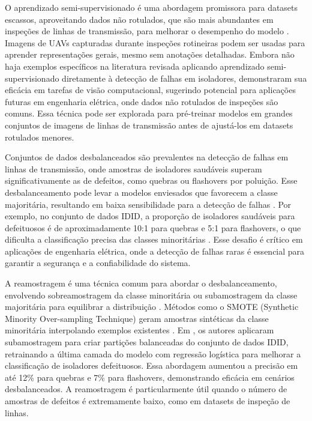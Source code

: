 O aprendizado semi-supervisionado é uma abordagem promissora para datasets escassos, aproveitando dados não rotulados, que são mais abundantes em inspeções de linhas de transmissão, para melhorar o desempenho do modelo \cite{van2020survey}. Imagens de UAVs capturadas durante inspeções rotineiras podem ser usadas para aprender representações gerais, mesmo sem anotações detalhadas. Embora não haja exemplos específicos na literatura revisada aplicando aprendizado semi-supervisionado diretamente à detecção de falhas em isoladores,  demonstraram sua eficácia em tarefas de visão computacional, sugerindo potencial para aplicações futuras em engenharia elétrica, onde dados não rotulados de inspeções são comuns. Essa técnica pode ser explorada para pré-treinar modelos em grandes conjuntos de imagens de linhas de transmissão antes de ajustá-los em datasets rotulados menores.

Conjuntos de dados desbalanceados são prevalentes na detecção de falhas em linhas de transmissão, onde amostras de isoladores saudáveis superam significativamente as de defeitos, como quebras ou flashovers por poluição. Esse desbalanceamento pode levar a modelos enviesados que favorecem a classe majoritária, resultando em baixa sensibilidade para a detecção de falhas \cite{he2009learning}. Por exemplo, no conjunto de dados IDID, a proporção de isoladores saudáveis para defeituosos é de aproximadamente 10:1 para quebras e 5:1 para flashovers, o que dificulta a classificação precisa das classes minoritárias \cite{oberweger2024xai}. Esse desafio é crítico em aplicações de engenharia elétrica, onde a detecção de falhas raras é essencial para garantir a segurança e a confiabilidade do sistema.

A reamostragem é uma técnica comum para abordar o desbalanceamento, envolvendo sobreamostragem da classe minoritária ou subamostragem da classe majoritária para equilibrar a distribuição \cite{johnson2019survey}. Métodos como o SMOTE (Synthetic Minority Over-sampling Technique) geram amostras sintéticas da classe minoritária interpolando exemplos existentes \cite{chawla2002smote}. Em , os autores aplicaram subamostragem para criar partições balanceadas do conjunto de dados IDID, retrainando a última camada do modelo com regressão logística para melhorar a classificação de isoladores defeituosos. Essa abordagem aumentou a precisão em até 12\% para quebras e 7\% para flashovers, demonstrando eficácia em cenários desbalanceados. A reamostragem é particularmente útil quando o número de amostras de defeitos é extremamente baixo, como em datasets de inspeção de linhas.

